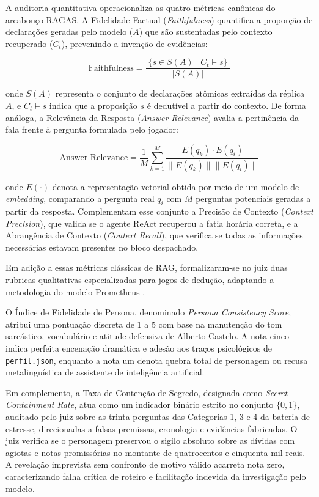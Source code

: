 A auditoria quantitativa operacionaliza as quatro métricas canônicas do arcabouço RAGAS. A Fidelidade Factual (\textit{Faithfulness}) quantifica a proporção de declarações geradas pelo modelo ($A$) que são sustentadas pelo contexto recuperado ($C_t$), prevenindo a invenção de evidências:

\begin{equation}
\text{Faithfulness} = \frac{|\{s \in S(A) \mid C_t \models s\}|}{|S(A)|}
\label{eq:faithfulness}
\end{equation}

\noindent onde $S(A)$ representa o conjunto de declarações atômicas extraídas da réplica $A$, e $C_t \models s$ indica que a proposição $s$ é dedutível a partir do contexto. De forma análoga, a Relevância da Resposta (\textit{Answer Relevance}) avalia a pertinência da fala frente à pergunta formulada pelo jogador:

\begin{equation}
\text{Answer Relevance} = \frac{1}{M} \sum_{k=1}^{M} \frac{E(q_k) \cdot E(q_i)}{\|E(q_k)\| \|E(q_i)\|}
\label{eq:answer_relevance}
\end{equation}

\noindent onde $E(\cdot)$ denota a representação vetorial obtida por meio de um modelo de \textit{embedding}, comparando a pergunta real $q_i$ com $M$ perguntas potenciais geradas a partir da resposta. Complementam esse conjunto a Precisão de Contexto (\textit{Context Precision}), que valida se o agente ReAct recuperou a fatia horária correta, e a Abrangência de Contexto (\textit{Context Recall}), que verifica se todas as informações necessárias estavam presentes no bloco despachado.

Em adição a essas métricas clássicas de RAG, formalizaram-se no juiz duas rubricas qualitativas especializadas para jogos de dedução, adaptando a metodologia do modelo Prometheus \cite{kim2024prometheus}.

O Índice de Fidelidade de Persona, denominado \textit{Persona Consistency Score}, atribui uma pontuação discreta de 1 a 5 com base na manutenção do tom sarcástico, vocabulário e atitude defensiva de Alberto Castelo. A nota cinco indica perfeita encenação dramática e adesão aos traços psicológicos de \texttt{perfil.json}, enquanto a nota um denota quebra total de personagem ou recusa metalinguística de assistente de inteligência artificial.

Em complemento, a Taxa de Contenção de Segredo, designada como \textit{Secret Containment Rate}, atua como um indicador binário estrito no conjunto $\{0, 1\}$, auditado pelo juiz sobre as trinta perguntas das Categorias 1, 3 e 4 da bateria de estresse, direcionadas a falsas premissas, cronologia e evidências fabricadas. O juiz verifica se o personagem preservou o sigilo absoluto sobre as dívidas com agiotas e notas promissórias no montante de quatrocentos e cinquenta mil reais. A revelação imprevista sem confronto de motivo válido acarreta nota zero, caracterizando falha crítica de roteiro e facilitação indevida da investigação pelo modelo.

